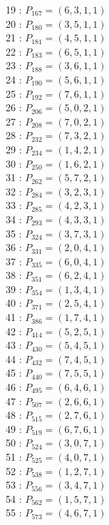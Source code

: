 \documentclass{article}
\begin{document}
{\begin{multicols}{2}
19 : $P_{167}=( 6, 3, 1, 1 )$\\
20 : $P_{180}=( 3, 5, 1, 1 )$\\
21 : $P_{181}=( 4, 5, 1, 1 )$\\
22 : $P_{183}=( 6, 5, 1, 1 )$\\
23 : $P_{188}=( 3, 6, 1, 1 )$\\
24 : $P_{190}=( 5, 6, 1, 1 )$\\
25 : $P_{192}=( 7, 6, 1, 1 )$\\
26 : $P_{206}=( 5, 0, 2, 1 )$\\
27 : $P_{208}=( 7, 0, 2, 1 )$\\
28 : $P_{232}=( 7, 3, 2, 1 )$\\
29 : $P_{234}=( 1, 4, 2, 1 )$\\
30 : $P_{250}=( 1, 6, 2, 1 )$\\
31 : $P_{262}=( 5, 7, 2, 1 )$\\
32 : $P_{284}=( 3, 2, 3, 1 )$\\
33 : $P_{285}=( 4, 2, 3, 1 )$\\
34 : $P_{293}=( 4, 3, 3, 1 )$\\
35 : $P_{324}=( 3, 7, 3, 1 )$\\
36 : $P_{331}=( 2, 0, 4, 1 )$\\
37 : $P_{335}=( 6, 0, 4, 1 )$\\
38 : $P_{351}=( 6, 2, 4, 1 )$\\
39 : $P_{354}=( 1, 3, 4, 1 )$\\
40 : $P_{371}=( 2, 5, 4, 1 )$\\
41 : $P_{386}=( 1, 7, 4, 1 )$\\
42 : $P_{414}=( 5, 2, 5, 1 )$\\
43 : $P_{430}=( 5, 4, 5, 1 )$\\
44 : $P_{432}=( 7, 4, 5, 1 )$\\
45 : $P_{440}=( 7, 5, 5, 1 )$\\
46 : $P_{495}=( 6, 4, 6, 1 )$\\
47 : $P_{507}=( 2, 6, 6, 1 )$\\
48 : $P_{515}=( 2, 7, 6, 1 )$\\
49 : $P_{519}=( 6, 7, 6, 1 )$\\
50 : $P_{524}=( 3, 0, 7, 1 )$\\
51 : $P_{525}=( 4, 0, 7, 1 )$\\
52 : $P_{538}=( 1, 2, 7, 1 )$\\
53 : $P_{556}=( 3, 4, 7, 1 )$\\
54 : $P_{562}=( 1, 5, 7, 1 )$\\
55 : $P_{573}=( 4, 6, 7, 1 )$\\
\end{multicols}
}
\end{document}

